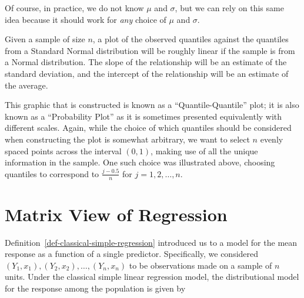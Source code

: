 \documentclass[
  letterpaper,
  DIV=11,
  numbers=noendperiod]{scrreprt}
\theoremstyle{definition}
\theoremstyle{plain}
\theoremstyle{definition}
\theoremstyle{remark}
\begin{document}
Of course, in practice, we do not know \(\mu\) and \(\sigma\), but we
can rely on this same idea because it should work for \emph{any} choice
of \(\mu\) and \(\sigma\).

\begin{tcolorbox}[enhanced jigsaw, breakable, colframe=quarto-callout-note-color-frame, titlerule=0mm, arc=.35mm, coltitle=black, opacitybacktitle=0.6, leftrule=.75mm, opacityback=0, left=2mm, toprule=.15mm, colbacktitle=quarto-callout-note-color!10!white, title=\textcolor{quarto-callout-note-color}{\faInfo}\hspace{0.5em}{Assessing Normality}, bottomtitle=1mm, toptitle=1mm, rightrule=.15mm, bottomrule=.15mm, colback=white]

Given a sample of size \(n\), a plot of the observed quantiles against
the quantiles from a Standard Normal distribution will be roughly linear
if the sample is from a Normal distribution. The slope of the
relationship will be an estimate of the standard deviation, and the
intercept of the relationship will be an estimate of the average.

\end{tcolorbox}

This graphic that is constructed is known as a ``Quantile-Quantile''
plot; it is also known as a ``Probability Plot'' as it is sometimes
presented equivalently with different scales. Again, while the choice of
which quantiles should be considered when constructing the plot is
somewhat arbitrary, we want to select \(n\) evenly spaced points across
the interval \((0, 1)\), making use of all the unique information in the
sample. One such choice was illustrated above, choosing quantiles to
correspond to \(\frac{j - 0.5}{n}\) for \(j = 1,2,\dotsc,n\).


\chapter{Matrix View of Regression}\label{sec-matrix}

\providecommand{\norm}[1]{\left\lVert#1\right\rVert}
\providecommand{\abs}[1]{\left\lvert#1\right\rvert}
\providecommand{\dist}[1]{\stackrel{\text{#1}}{\sim}}
\providecommand{\ind}[1]{\mathbb{I}\left(#1\right)}
\providecommand{\bm}[1]{\mathbf{#1}}
\providecommand{\bs}[1]{\boldsymbol{#1}}
\providecommand{\Ell}{\mathcal{L}}
\providecommand{\indep}{\perp\negthickspace\negmedspace\perp}

Definition~\ref{def-classical-simple-regression} introduced us to a
model for the mean response as a function of a single predictor.
Specifically, we considered
\(\left(Y_1, x_1\right), \left(Y_2, x_2\right), \dotsc, \left(Y_n, x_n\right)\)
to be observations made on a sample of \(n\) units. Under the classical
simple linear regression model, the distributional model for the
response among the population is given by
\end{document}
